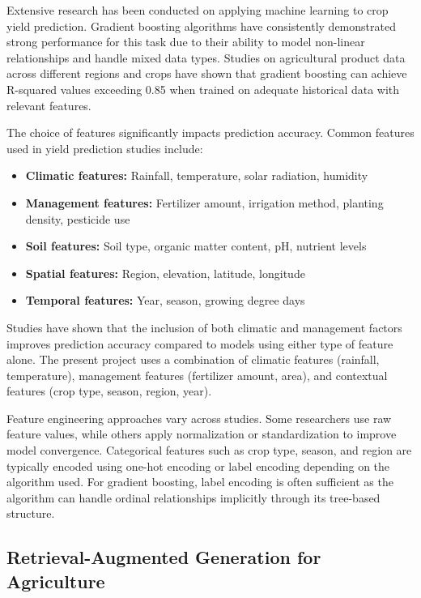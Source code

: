 Extensive research has been conducted on applying machine learning to crop yield prediction. Gradient boosting algorithms have consistently demonstrated strong performance for this task due to their ability to model non-linear relationships and handle mixed data types. Studies on agricultural product data across different regions and crops have shown that gradient boosting can achieve R-squared values exceeding 0.85 when trained on adequate historical data with relevant features.

The choice of features significantly impacts prediction accuracy. Common features used in yield prediction studies include:
\begin{itemize}
  \item \textbf{Climatic features:} Rainfall, temperature, solar radiation, humidity
  \item \textbf{Management features:} Fertilizer amount, irrigation method, planting density, pesticide use
  \item \textbf{Soil features:} Soil type, organic matter content, pH, nutrient levels
  \item \textbf{Spatial features:} Region, elevation, latitude, longitude
  \item \textbf{Temporal features:} Year, season, growing degree days
\end{itemize}

Studies have shown that the inclusion of both climatic and management factors improves prediction accuracy compared to models using either type of feature alone. The present project uses a combination of climatic features (rainfall, temperature), management features (fertilizer amount, area), and contextual features (crop type, season, region, year).

Feature engineering approaches vary across studies. Some researchers use raw feature values, while others apply normalization or standardization to improve model convergence. Categorical features such as crop type, season, and region are typically encoded using one-hot encoding or label encoding depending on the algorithm used. For gradient boosting, label encoding is often sufficient as the algorithm can handle ordinal relationships implicitly through its tree-based structure.

\subsection{Retrieval-Augmented Generation for Agriculture}

